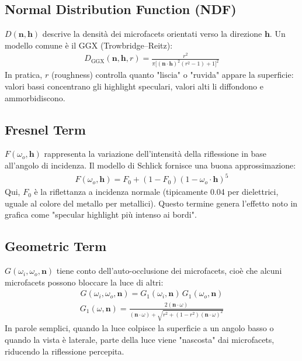 \documentclass[12pt,a4paper,openright,twoside]{book}
\begin{document}
\subsection*{Normal Distribution Function (NDF)}
$D(\mathbf{n},\mathbf{h})$ descrive la densità dei microfacets orientati verso la direzione $\mathbf{h}$.  
Un modello comune è il GGX (Trowbridge–Reitz):
\begin{align*}
D_{\text{GGX}}(\mathbf{n},\mathbf{h},r) =
\frac{r^2}
{\pi \big[(\mathbf{n}\cdot\mathbf{h})^2(r^2-1)+1\big]^2}
\end{align*}
\noindent
In pratica, $r$ (roughness) controlla quanto "liscia" o "ruvida" appare la superficie: valori bassi concentrano gli
highlight speculari, valori alti li diffondono e ammorbidiscono.

\subsection*{Fresnel Term}
$F(\omega_o,\mathbf{h})$ rappresenta la variazione dell'intensità della riflessione in base all'angolo di incidenza.
Il modello di Schlick fornisce una buona approssimazione:
\begin{align*}
F(\omega_o,\mathbf{h}) = F_0 + (1 - F_0)(1 - \omega_o\cdot\mathbf{h})^5
\end{align*}
\noindent
Qui, $F_0$ è la riflettanza a incidenza normale (tipicamente 0.04 per dielettrici, uguale al colore del
metallo per metallici).
Questo termine genera l'effetto noto in grafica come "specular highlight più intenso ai bordi".

\subsection*{Geometric Term}
$G(\omega_i,\omega_o,\mathbf{n})$ tiene conto dell'auto-occlusione dei microfacets, cioè che alcuni microfacets
possono bloccare la luce di altri:
\begin{align*}
G(\omega_i,\omega_o,\mathbf{n}) = G_1(\omega_i,\mathbf{n}) \, G_1(\omega_o,\mathbf{n})
\end{align*}
\begin{align*}
G_1(\omega,\mathbf{n}) =
\frac{2(\mathbf{n}\cdot\omega)}
{(\mathbf{n}\cdot\omega) + \sqrt{r^2 + (1-r^2)(\mathbf{n}\cdot\omega)^2}}
\end{align*}
In parole semplici, quando la luce colpisce la superficie a un angolo basso o quando la vista è laterale, parte
della luce viene "nascosta" dai microfacets, riducendo la riflessione percepita.
\end{document}

